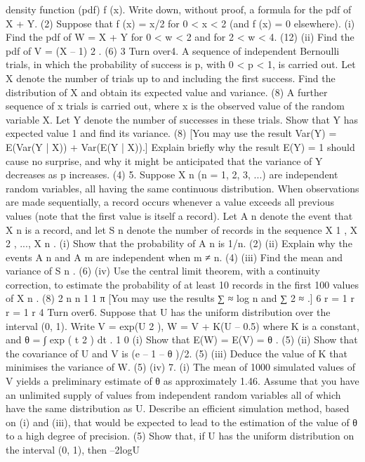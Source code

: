 density function (pdf) f (x). Write down, without proof, a formula for the pdf of X + Y.
(2)
Suppose that f (x) = x/2 for 0 < x < 2 (and f (x) = 0 elsewhere).
(i)
Find the pdf of W = X + Y for 0 < w < 2 and for 2 < w < 4.
(12)
(ii)
Find the pdf of V = (X – 1) 2 .
(6)
3
Turn over4.
A sequence of independent Bernoulli trials, in which the probability of success is p,
with 0 < p < 1, is carried out.
Let X denote the number of trials up to and including the first success. Find the
distribution of X and obtain its expected value and variance.
(8)
A further sequence of x trials is carried out, where x is the observed value of the
random variable X. Let Y denote the number of successes in these trials. Show that Y
has expected value 1 and find its variance.
(8)
[You may use the result Var(Y) = E(Var(Y | X)) + Var(E(Y | X)).]
Explain briefly why the result E(Y) = 1 should cause no surprise, and why it might be
anticipated that the variance of Y decreases as p increases.
(4)
5.
Suppose {X n } (n = 1, 2, 3, ...) are independent random variables, all having the same
continuous distribution. When observations are made sequentially, a record occurs
whenever a value exceeds all previous values (note that the first value is itself a
record). Let A n denote the event that X n is a record, and let S n denote the number of
records in the sequence {X 1 , X 2 , ..., X n }.
(i)
Show that the probability of A n is 1/n.
(2)
(ii)
Explain why the events A n and A m are independent when m ≠ n.
(4)
(iii)
Find the mean and variance of S n .
(6)
(iv)
Use the central limit theorem, with a continuity correction, to estimate the
probability of at least 10 records in the first 100 values of {X n }.
(8)
2
n
n
1
1 π
[You may use the results ∑ ≈ log n and ∑ 2 ≈
.]
6
r = 1 r
r = 1 r
4
Turn over6.
Suppose that U has the uniform distribution over the interval (0, 1).
Write V = exp(U 2 ), W = V + K(U – 0.5) where K is a constant, and θ = ∫ exp ( t 2 ) dt .
1
0
(i)
Show that E(W) = E(V) = θ .
(5)
(ii)
Show that the covariance of U and V is (e – 1 – θ )/2.
(5)
(iii)
Deduce the value of K that minimises the variance of W.
(5)
(iv)
7.
(i)
The mean of 1000 simulated values of V yields a preliminary estimate of θ as
approximately 1.46. Assume that you have an unlimited supply of values from
independent random variables all of which have the same distribution as U.
Describe an efficient simulation method, based on (i) and (iii), that would be
expected to lead to the estimation of the value of θ to a high degree of
precision.
(5)
Show that, if U has the uniform distribution on the interval (0, 1), then –2logU
